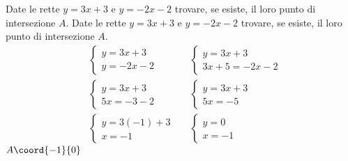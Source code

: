 \begin{exercise}
	Date le rette $y=3x+3$ e $y=-2x-2$ trovare, se esiste, il loro punto di intersezione $A$.
	\tcblower
	Date le rette $y=3x+3$ e $y=-2x-2$ trovare, se esiste, il loro punto di intersezione $A$.
	\begin{align*}
		&\begin{cases}
			y=3x+3\\
			y=-2x-2
		\end{cases}
		&&\begin{cases}
			y=3x+3\\
			3x+5=-2x-2
		\end{cases}\\
		&\begin{cases}
			y=3x+3\\
			5x=-3-2
		\end{cases}
		&&\begin{cases}
			y=3x+3\\
			5x=-5
		\end{cases}\\
		&\begin{cases}
			y=3(-1)+3\\
			x=-1
		\end{cases}
		&&\begin{cases}
			y=0\\
			x=-1
		\end{cases}
	\end{align*}
	$A\coord{-1}{0}$
	\begin{center}
		
	\end{center}
\end{exercise}
